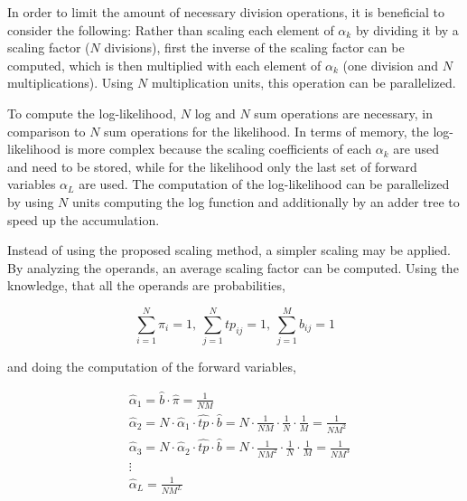 \documentclass[mscthesis]{usiinfthesis}
\begin{document}
In order to limit the amount of necessary division operations, it is beneficial
to consider the following: Rather than scaling each element of $ \alpha_k $ by
dividing it by a scaling factor ($ N $ divisions), first the inverse of the
scaling factor can be computed, which is then multiplied with each element of
$ \alpha_k $ (one division and $ N $ multiplications). Using
$ N $ multiplication units, this operation can be parallelized.

To compute the log-likelihood, $ N $ log and $ N $ sum operations are
necessary, in comparison to $ N $ sum operations for the likelihood. In terms
of memory, the log-likelihood is more complex because the scaling coefficients
of each $ \alpha_k $ are used and need to be stored, while for the likelihood
only the last set of forward variables $ \alpha_L $ are used. The computation
of the log-likelihood can be parallelized by using $ N $ units computing the
log function and additionally by an adder tree to speed up the accumulation.

Instead of using the proposed scaling method, a simpler scaling may be applied.
By analyzing the operands, an average scaling factor can be computed. Using the
knowledge, that all the operands are probabilities,

\begin{equation}
    \sum\limits_{i=1}^{N} \pi_i = 1, \
    \sum\limits_{j=1}^{N} tp_{ij} = 1, \
    \sum\limits_{j=1}^{M} b_{ij} = 1
\end{equation}

and doing the computation of the forward variables,

\begin{equation}\begin{split}
    &\hat{\alpha}_1 = \hat{b} \cdot \hat{\pi} = \frac{1}{NM} \\
    &\hat{\alpha}_2 = N \cdot \hat{\alpha}_1 \cdot \hat{tp} \cdot \hat{b} =
        N \cdot \frac{1}{NM} \cdot \frac{1}{N} \cdot \frac{1}{M} =
        \frac{1}{NM^2} \\
    &\hat{\alpha}_3 = N \cdot \hat{\alpha}_2 \cdot \hat{tp} \cdot \hat{b} =
        N \cdot \frac{1}{NM^2} \cdot \frac{1}{N} \cdot \frac{1}{M} =
        \frac{1}{NM^3} \\
    &\vdots\\
    & \hat{\alpha}_L = \frac{1}{NM^L}
\end{split}\end{equation}
\end{document}
